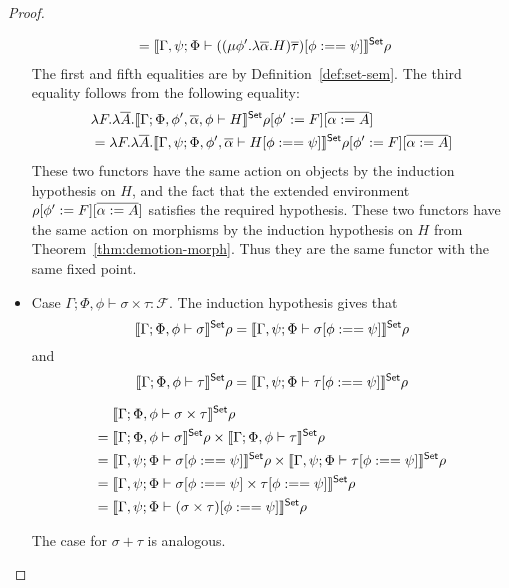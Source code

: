 \documentclass[acmsmall,review,anonymous]{acmart}
\theoremstyle{definition}
\newcommand{\F}{\mathcal{F}}
\begin{document}
\begin{proof}
\begin{itemize}
\begin{align*}
        = \; & \llbracket{\Gamma, \psi; \Phi \vdash ((\mu \phi'. \lambda \overline{\alpha}. H) \overline{\tau})[\phi :== \psi] }\rrbracket^{\mathsf{Set}} \rho 
      \end{align*} 
      The first and fifth equalities are by Definition~\ref{def:set-sem}.
      The third equality follows from the following equality:
      \begin{align*}
        &\lambda F. \lambda \overline{A}. \llbracket{\Gamma; \Phi, \phi', \overline{\alpha}, \phi \vdash H}\rrbracket^{\mathsf{Set}} \rho[\phi' := F][\overline{\alpha := A}] \\
        & = \lambda F. \lambda \overline{A}. \llbracket{\Gamma, \psi; \Phi, \phi', \overline{\alpha} \vdash H[\phi :== \psi]}\rrbracket^{\mathsf{Set}} \rho[\phi' := F][\overline{\alpha := A}]
      \end{align*}
      These two functors have the same action on objects by the induction hypothesis on $H$, and the fact
      that the extended environment $\rho[\phi' := F][\overline{\alpha := A}]$ satisfies the required
      hypothesis. These two functors have the same action on morphisms by the induction hypothesis
      on $H$ from Theorem~\ref{thm:demotion-morph}. Thus they are the same functor with the same fixed point.

  \item Case $\Gamma; \Phi, \phi \vdash \sigma \times \tau : \F$. The induction hypothesis gives that 
      $$\llbracket{\Gamma; \Phi, \phi \vdash \sigma }\rrbracket^{\mathsf{Set}} \rho
        = \llbracket{\Gamma, \psi; \Phi \vdash \sigma[\phi :== \psi] }\rrbracket^{\mathsf{Set}} \rho$$ 
        and
      $$\llbracket{\Gamma; \Phi, \phi \vdash \tau }\rrbracket^{\mathsf{Set}} \rho
        = \llbracket{\Gamma, \psi; \Phi \vdash \tau[\phi :== \psi] }\rrbracket^{\mathsf{Set}} \rho$$ 

    \begin{align*}
           & \llbracket{\Gamma; \Phi, \phi \vdash \sigma \times \tau}\rrbracket^{\mathsf{Set}} \rho \\
      = \; & \llbracket{\Gamma; \Phi, \phi \vdash \sigma}\rrbracket^{\mathsf{Set}} \rho \times \llbracket{\Gamma; \Phi, \phi \vdash \tau}\rrbracket^{\mathsf{Set}} \rho\\
      = \; & \llbracket{\Gamma, \psi; \Phi \vdash \sigma[\phi :== \psi]}\rrbracket^{\mathsf{Set}} \rho \times \llbracket{\Gamma, \psi; \Phi \vdash \tau[\phi :== \psi]}\rrbracket^{\mathsf{Set}} \rho\\
      = \; & \llbracket{\Gamma, \psi; \Phi \vdash \sigma[\phi :==\psi] \times \tau[\phi :== \psi]}\rrbracket^{\mathsf{Set}} \rho \\
      = \; & \llbracket{\Gamma, \psi; \Phi \vdash (\sigma \times \tau)[\phi :== \psi]}\rrbracket^{\mathsf{Set}} \rho
    \end{align*}

    The case for $\sigma + \tau$ is analogous.
\end{itemize}
\end{proof}
\end{document}
